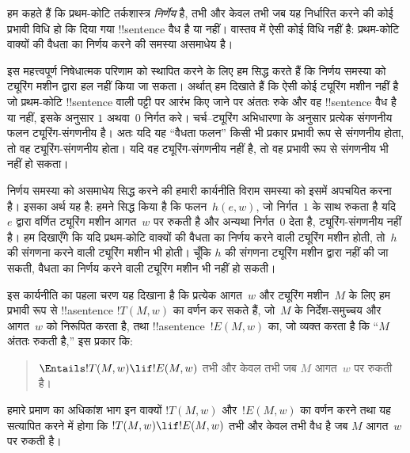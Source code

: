 \documentclass[../../../include/open-logic-section]{subfiles}
\begin{document}

हम कहते हैं कि प्रथम-कोटि तर्कशास्त्र \emph{निर्णेय} है, तभी और केवल
तभी जब यह निर्धारित करने की कोई प्रभावी विधि हो कि दिया गया
!!{sentence} वैध है या नहीं। वास्तव में ऐसी कोई विधि नहीं है: प्रथम-कोटि
वाक्यों की वैधता का निर्णय करने की समस्या असमाधेय है।

इस महत्त्वपूर्ण निषेधात्मक परिणाम को स्थापित करने के लिए हम सिद्ध करते
हैं कि निर्णय समस्या को ट्यूरिंग मशीन द्वारा हल नहीं किया जा सकता।
अर्थात् हम दिखाते हैं कि ऐसी कोई ट्यूरिंग मशीन नहीं है जो प्रथम-कोटि
!!{sentence} वाली पट्टी पर आरंभ किए जाने पर अंततः रुके और वह !!{sentence}
वैध है या नहीं, इसके अनुसार $1$ अथवा~$0$ निर्गत करे। चर्च--ट्यूरिंग
अभिधारणा के अनुसार प्रत्येक संगणनीय फलन ट्यूरिंग-संगणनीय है। अतः यदि यह
``वैधता फलन'' किसी भी प्रकार प्रभावी रूप से संगणनीय होता, तो वह
ट्यूरिंग-संगणनीय होता। यदि वह ट्यूरिंग-संगणनीय नहीं है, तो वह प्रभावी
रूप से संगणनीय भी नहीं हो सकता।

निर्णय समस्या को असमाधेय सिद्ध करने की हमारी कार्यनीति विराम समस्या को
इसमें अपचयित करना है। इसका अर्थ यह है: हमने सिद्ध किया है कि फलन~$h(e,w)$,
जो निर्गत~$1$ के साथ रुकता है यदि~$e$ द्वारा वर्णित ट्यूरिंग मशीन
आगत~$w$ पर रुकती है और अन्यथा निर्गत~$0$ देता है, ट्यूरिंग-संगणनीय
नहीं है। हम
दिखाएँगे कि यदि प्रथम-कोटि वाक्यों की वैधता का निर्णय करने वाली ट्यूरिंग
मशीन होती, तो~$h$ की संगणना करने वाली ट्यूरिंग मशीन भी होती। चूँकि $h$
की संगणना ट्यूरिंग मशीन द्वारा नहीं की जा सकती, वैधता का निर्णय करने
वाली ट्यूरिंग मशीन भी नहीं हो सकती।

इस कार्यनीति का पहला चरण यह दिखाना है कि प्रत्येक आगत~$w$ और ट्यूरिंग
मशीन~$M$ के लिए हम प्रभावी रूप से !!a{sentence} $!T(M, w)$ का वर्णन
कर सकते हैं, जो~$M$ के निर्देश-समुच्चय और आगत~$w$ को निरूपित करता है,
तथा !!a{sentence}~$!E(M, w)$ का, जो व्यक्त करता है कि “$M$ अंततः रुकती
है,” इस प्रकार कि:
\begin{quote}
  $\Entails !T(M, w) \lif !E(M,w)$ तभी और केवल तभी जब $M$ आगत~$w$ पर
  रुकती है।
\end{quote}
हमारे प्रमाण का अधिकांश भाग इन वाक्यों $!T(M, w)$ और~$!E(M, w)$ का वर्णन
करने तथा यह सत्यापित करने में होगा कि $!T(M, w) \lif !E(M, w)$ तभी और
केवल तभी वैध है जब $M$ आगत~$w$ पर रुकती है।
\end{document}
